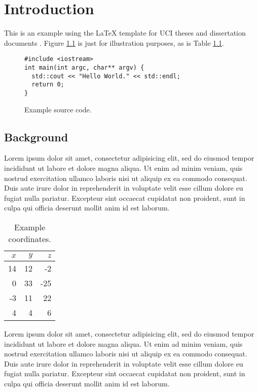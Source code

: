 \chapter{Introduction}

This is an example using the \LaTeX{} template for UCI theses and
dissertation documents \cite{uci-thesis-latex}. Figure
\ref{fig:sourcecode} is just for illustration purposes, as is Table
\ref{tab:coordinates}.

\begin{figure}
\begin{verbatim}
#include <iostream>
int main(int argc, char** argv) {
  std::cout << "Hello World." << std::endl;
  return 0;
}
\end{verbatim}
  \caption{Example source code.}
  \label{fig:sourcecode}
\end{figure}

\section{Background}

Lorem ipsum dolor sit amet, consectetur adipisicing elit, sed do
eiusmod tempor incididunt ut labore et dolore magna aliqua. Ut enim ad
minim veniam, quis nostrud exercitation ullamco laboris nisi ut
aliquip ex ea commodo consequat. Duis aute irure dolor in
reprehenderit in voluptate velit esse cillum dolore eu fugiat nulla
pariatur. Excepteur sint occaecat cupidatat non proident, sunt in
culpa qui officia deserunt mollit anim id est laborum.

\begin{table}
  \centering
  \begin{tabular}{|rr|r|}
    \hline
    $x$ & $y$ & $z$ \\
    \hline
    14 & 12 & -2 \\
    0 & 33 & -25 \\
    -3 & 11 & 22 \\
    4 & 4 & 6 \\
    \hline
  \end{tabular}
  \caption{Example coordinates.}
  \label{tab:coordinates}
\end{table}

Lorem ipsum dolor sit amet, consectetur adipisicing elit, sed do
eiusmod tempor incididunt ut labore et dolore magna aliqua. Ut enim ad
minim veniam, quis nostrud exercitation ullamco laboris nisi ut
aliquip ex ea commodo consequat. Duis aute irure dolor in
reprehenderit in voluptate velit esse cillum dolore eu fugiat nulla
pariatur. Excepteur sint occaecat cupidatat non proident, sunt in
culpa qui officia deserunt mollit anim id est laborum.


